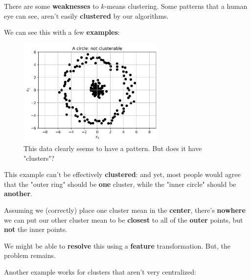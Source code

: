     
        There are some \textbf{weaknesses} to $k$-means clustering. Some patterns that a human eye can see, aren't easily \textbf{clustered} by our algorithms.
        
        We can see this with a few \textbf{examples}:
        
        \begin{figure}[h]
            \centering
            \includegraphics[width=0.65\textwidth]{images/clustering_images/center_unclusterable.png}
            \caption*{This data clearly seems to have a pattern. But does it have "clusters"?}
        \end{figure}
        
        This example can't be effectively \textbf{clustered}: and yet, most people would agree that the "outer ring" should be \textbf{one} cluster, while the "inner circle" should be \textbf{another}.
        
        Assuming we (correctly) place one cluster mean in the \textbf{center}, there's \textbf{nowhere} we can put our other cluster mean to be \textbf{closest} to all of the \textbf{outer} points, but \textbf{not} the inner points.
        
        We might be able to \textbf{resolve} this using a \textbf{feature} transformation. But, the problem remains.
            
        Another example works for clusters that aren't very centralized:
        
